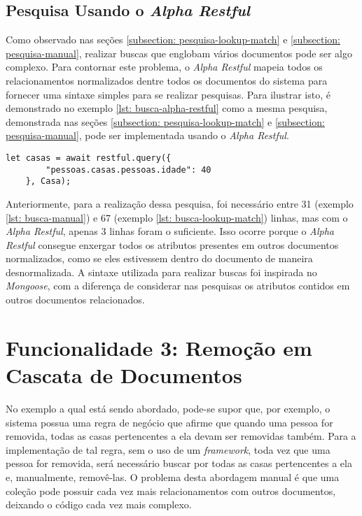 \subsection{Pesquisa Usando o \textit{Alpha Restful}\label{subsection: pesquisa-usando-alpha-restful}}

Como observado nas seções \ref{subsection: pesquisa-lookup-match} e \ref{subsection: pesquisa-manual}, realizar buscas que englobam vários documentos pode ser algo complexo. Para contornar este problema, o \textit{Alpha Restful} mapeia todos os relacionamentos normalizados dentre todos os documentos do sistema para fornecer uma sintaxe simples para se realizar pesquisas. Para ilustrar isto, é demonstrado no exemplo \ref{lst: busca-alpha-restful} como a mesma pesquisa, demonstrada nas seções \ref{subsection: pesquisa-lookup-match} e \ref{subsection: pesquisa-manual}, pode ser implementada usando o \textit{Alpha Restful}.
    
\begin{lstlisting}[style=ES6, caption={Busca em Dados Normalizados com o \textit{Alpha Restful}\label{lst: busca-alpha-restful}}]
    let casas = await restful.query({
        "pessoas.casas.pessoas.idade": 40
    }, Casa);
\end{lstlisting}
    
Anteriormente, para a realização dessa pesquisa, foi necessário entre 31 (exemplo \ref{lst: busca-manual}) e 67 (exemplo \ref{lst: busca-lookup-match}) linhas, mas com o \textit{Alpha Restful}, apenas 3 linhas foram o suficiente. Isso ocorre porque o \textit{Alpha Restful} consegue enxergar todos os atributos presentes em outros documentos normalizados, como se eles estivessem dentro do documento de maneira desnormalizada. A sintaxe utilizada para realizar buscas foi inspirada no \textit{Mongoose}, com a diferença de considerar nas pesquisas os atributos contidos em outros documentos relacionados.

\section{Funcionalidade 3: Remoção em Cascata de Documentos\label{section: remocao-cascata-documentos-relacionados}}
    
No exemplo a qual está sendo abordado, pode-se supor que, por exemplo, o sistema possua uma regra de negócio que afirme que quando uma pessoa for removida, todas as casas pertencentes a ela devam ser removidas também. Para a implementação de tal regra, sem o uso de um \textit{framework}, toda vez que uma pessoa for removida, será necessário buscar por todas as casas pertencentes a ela e, manualmente, removê-las. O problema desta abordagem manual é que uma coleção pode possuir cada vez mais relacionamentos com outros documentos, deixando o código cada vez mais complexo.

